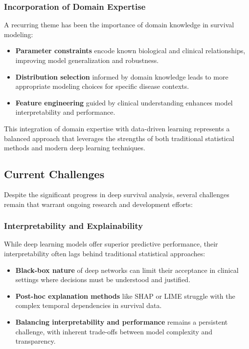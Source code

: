 \subsubsection{Incorporation of Domain Expertise}

A recurring theme has been the importance of domain knowledge in survival modeling:

\begin{itemize}
    \item \textbf{Parameter constraints} encode known biological and clinical relationships, improving model generalization and robustness.

    \item \textbf{Distribution selection} informed by domain knowledge leads to more appropriate modeling choices for specific disease contexts.

    \item \textbf{Feature engineering} guided by clinical understanding enhances model interpretability and performance.
\end{itemize}

This integration of domain expertise with data-driven learning represents a balanced approach that leverages the strengths of both traditional statistical methods and modern deep learning techniques.

\subsection{Current Challenges}

Despite the significant progress in deep survival analysis, several challenges remain that warrant ongoing research and development efforts:

\subsubsection{Interpretability and Explainability}

While deep learning models offer superior predictive performance, their interpretability often lags behind traditional statistical approaches:

\begin{itemize}
    \item \textbf{Black-box nature} of deep networks can limit their acceptance in clinical settings where decisions must be understood and justified.

    \item \textbf{Post-hoc explanation methods} like SHAP or LIME struggle with the complex temporal dependencies in survival data.

    \item \textbf{Balancing interpretability and performance} remains a persistent challenge, with inherent trade-offs between model complexity and transparency.
\end{itemize}

